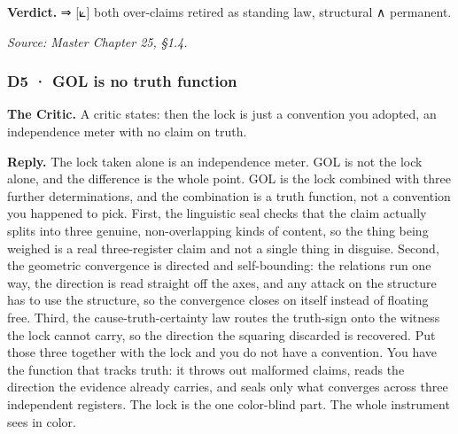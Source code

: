 \documentclass[10pt,twocolumn]{article}
\begin{document}
\textbf{Verdict.} ⇒ {[}⟀{]} both over-claims retired as standing law,
structural ∧ permanent.

\emph{Source: Master Chapter 25, §1.4.}

\hypertarget{d5-gol-is-no-truth-function}{%
\subsubsection{D5 · GOL is no truth
function}\label{d5-gol-is-no-truth-function}}

\textbf{The Critic.} A critic states: then the lock is just a convention
you adopted, an independence meter with no claim on truth.

\textbf{Reply.} The lock taken alone is an independence meter. GOL is
not the lock alone, and the difference is the whole point. GOL is the
lock combined with three further determinations, and the combination is
a truth function, not a convention you happened to pick. First, the
linguistic seal checks that the claim actually splits into three
genuine, non-overlapping kinds of content, so the thing being weighed is
a real three-register claim and not a single thing in disguise. Second,
the geometric convergence is directed and self-bounding: the relations
run one way, the direction is read straight off the axes, and any attack
on the structure has to use the structure, so the convergence closes on
itself instead of floating free. Third, the cause-truth-certainty law
routes the truth-sign onto the witness the lock cannot carry, so the
direction the squaring discarded is recovered. Put those three together
with the lock and you do not have a convention. You have the function
that tracks truth: it throws out malformed claims, reads the direction
the evidence already carries, and seals only what converges across three
independent registers. The lock is the one color-blind part. The whole
instrument sees in color.
\end{document}
